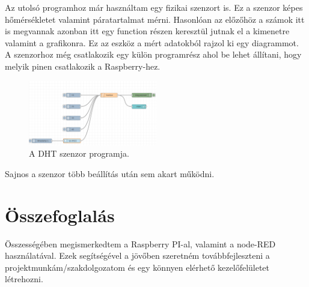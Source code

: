 \documentclass[a4paper,12pt,oneside]{report}
\begin{document}
Az utolsó programhoz már használtam egy fizikai szenzort is. Ez a szenzor képes hőmérsékletet valamint páratartalmat mérni.
Hasonlóan az előzőhöz a számok itt is megvannak azonban itt egy function részen keresztül jutnak el a kimenetre valamint a 
grafikonra. Ez az eszköz a mért adatokból rajzol ki egy diagrammot. A szenzorhoz még csatlakozik egy külön programrész ahol be lehet
állítani, hogy melyik pinen csatlakozik a Raspberry-hez.

\begin{figure}[htbp]
	\centering
	\includegraphics[width=0.5\textwidth]{fig/dht.png}
	\caption{A DHT szenzor programja.}
	\label{fig-dht}
\end{figure}

Sajnos a szenzor több beállítás után sem akart működni.

\chapter{Összefoglalás}

Összességében megismerkedtem a Raspberry PI-al, valamint a node-RED használatával. Ezek segítségével a jövőben szeretném 
továbbfejleszteni a projektmunkám/szakdolgozatom és egy könnyen elérhető kezelőfelületet létrehozni.
\end{document}
